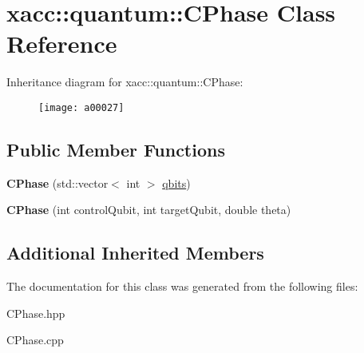 \hypertarget{a00027}{}\section{xacc\+:\+:quantum\+:\+:C\+Phase Class Reference}
\label{a00027}
Inheritance diagram for xacc\+:\+:quantum\+:\+:C\+Phase\+:\begin{figure}[H]
\begin{center}
\leavevmode
\texttt{[image: a00027]}
\end{center}
\end{figure}
\subsection*{Public Member Functions}
\begin{DoxyCompactItemize}
\item 
{\bfseries C\+Phase} (std\+::vector$<$ int $>$ \hyperlink{a00041_a2a56be6c2519ea65df4d06f4abae1393}{qbits})\hypertarget{a00027_a5899f838bc4b892d179f51fcf0ac4cc8}{}\label{a00027_a5899f838bc4b892d179f51fcf0ac4cc8}

\item 
{\bfseries C\+Phase} (int control\+Qubit, int target\+Qubit, double theta)\hypertarget{a00027_af642f499455f0065279a1e1d178c818f}{}\label{a00027_af642f499455f0065279a1e1d178c818f}

\end{DoxyCompactItemize}
\subsection*{Additional Inherited Members}


The documentation for this class was generated from the following files\+:\begin{DoxyCompactItemize}
\item 
C\+Phase.\+hpp\item 
C\+Phase.\+cpp\end{DoxyCompactItemize}
